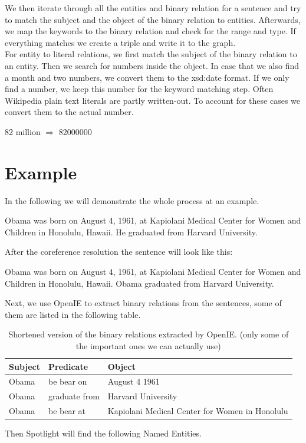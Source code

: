 \documentclass[runningheads]{llncs}
\begin{document}
We then iterate through all the entities and binary relation for a sentence and try to match the subject and the object of the binary relation to entities. Afterwards, we map the keywords to the binary relation and check for the range and type. If everything matches we create a triple and write it to the graph. \\

For entity to literal relations, we first match the subject of the binary relation to an entity. Then we search for numbers inside the object. In case that we also find a month and two numbers, we convert them to the xsd:date format. If we only find a number, we keep this number for the keyword matching step. Often Wikipedia plain text literals are partly written-out. To account for these cases we convert them to the actual number. 
\begin{example} 82 million $\Rightarrow$ 82000000 \end{example}
   
\section{Example}
In the following we will demonstrate the whole process at an example.

\begin{example}
Obama was born on August 4, 1961, at Kapiolani Medical Center for
Women and Children in Honolulu, Hawaii. He graduated from Harvard
University.\end{example}

After the coreference resolution the sentence will look like this: 

\begin{example}
	Obama was born on August 4, 1961, at Kapiolani Medical Center for
	Women and Children in Honolulu, Hawaii. Obama graduated from Harvard
	University.\end{example}

Next, we use OpenIE to extract binary relations from the sentences, some of them are listed in the following table.


\begin{table}
		\caption{Shortened version of the binary relations extracted by OpenIE. (only some of the important ones we can actually use)}\label{tab1}
	\begin{center}
		\begin{tabularx}{\textwidth}{@{}|l|l|Y|@{}}
			\hline
			\textbf{Subject} &  \textbf{Predicate} & \textbf{Object}\\
			\hline
			Obama &  be bear on & August 4 1961\\
			Obama &  graduate from & Harvard University\\
			Obama &  be bear at & Kapiolani Medical Center for Women in Honolulu\\
			\hline
		\end{tabularx}
	\end{center}
\end{table}
\pagebreak
Then Spotlight will find the following Named Entities.
\end{document}
